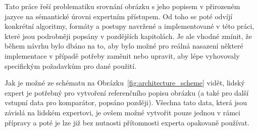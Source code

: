 Tato práce řeší problematiku srovnání obrázku s jeho popisem v přirozeném jazyce na sémantické úrovni expertním přístupem.
Od toho se poté odvíjí konkrétní algoritmy, formáty a postupy navržené a implementované v této práci,
které jsou podrobněji popsány v pozdějších kapitolách.
Je ale vhodné zmínit, že během návrhu bylo dbáno na to, aby bylo možné pro reálná nasazení některé implementace v případě potřeby zaměnit nebo upravit,
aby lépe vyhovovaly specifickým požadavkům pro dané použití.

Jak je možné ze schématu na Obrázku~\ref{fig:architecture_scheme} vidět, lidský expert je potřebný pro vytvoření referenčního popisu obrázku
(a také pro další vstupní data pro komparátor, popsáno později).
Všechna tato data, která jsou závislá na lidském expertovi, je ovšem možné vytvořit pouze jednou v rámci přípravy
a poté je lze již bez nutnosti přítomnosti experta opakovaně používat.
